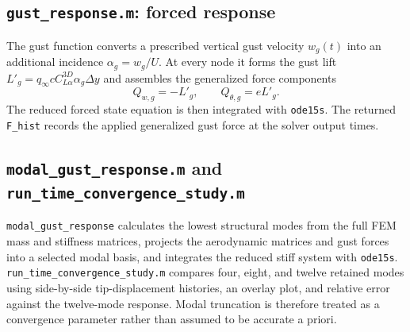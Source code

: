 \documentclass[11pt]{article}
\begin{document}
\subsection{\texttt{gust\_response.m}: forced response}

The gust function converts a prescribed vertical gust velocity $w_g(t)$ into an
additional incidence $\alpha_g=w_g/U$. At every node it forms the gust lift
$L'_g=q_\infty c C_{L\alpha}^{3D}\alpha_g\Delta y$ and assembles the generalized
force components
\begin{equation}
 Q_{w,g}=-L'_g,\qquad Q_{\theta,g}=eL'_g.
\end{equation}
The reduced forced state equation is then integrated with \texttt{ode15s}. The returned
\texttt{F\_hist} records the applied generalized gust force at the solver output times.

\subsection{\texttt{modal\_gust\_response.m} and
\texttt{run\_time\_convergence\_study.m}}

\texttt{modal\_gust\_response} calculates the lowest structural modes from the full FEM
mass and stiffness matrices, projects the aerodynamic matrices and gust forces into a
selected modal basis, and integrates the reduced stiff system with \texttt{ode15s}.
\texttt{run\_time\_convergence\_study.m} compares four, eight, and twelve retained modes
using side-by-side tip-displacement histories, an overlay plot, and relative error
against the twelve-mode response. Modal truncation is therefore treated as a
convergence parameter rather than assumed to be accurate a priori.
\end{document}
